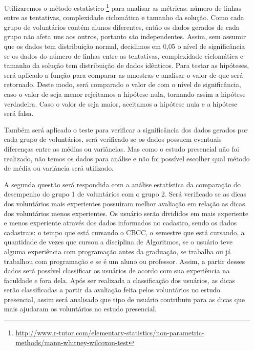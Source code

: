 Utilizaremos o método estatístico \footnote{\url{http://www.r-tutor.com/elementary-statistics/non-parametric-methods/mann-whitney-wilcoxon-test}} para analisar as métricas: número de linhas entre as tentativas, complexidade ciclomática e tamanho da solução. Como cada grupo de voluntários contém alunos diferentes, então os dados gerados de cada grupo não afeta uns aos outros, portanto são independentes. Assim, sem assumir que os dados tem distribuição normal, decidimos em 0,05 o nível de significância se os dados do número de linhas entre as tentativas, complexidade ciclomática e tamanho da solução tem distribuição de dados idênticos. Para testar as hipóteses, será aplicado a função  para comparar as amostras e analisar o valor de  que será retornado. Deste modo, será comparado o valor de  com o nível de significância, caso o valor de  seja menor rejeitamos a hipótese nula, tornando assim a hipótese verdadeira. Caso o valor de  seja maior, aceitamos a hipótese nula e a hipótese será falsa. 

Também será aplicado o teste  \cite{macbeth2011cliff} para verificar a significância dos dados gerados por cada grupo de voluntários, será verificado se os dados possuem eventuais diferenças entre as médias ou variâncias. Mas como o estudo presencial não foi realizado, não temos os dados para análise e não foi possível escolher qual método de média ou variância será utilizado.

A segunda questão será respondida com a análise estatística da comparação do desempenho do grupo 1 de voluntários com o grupo 2. Será verificado se as dicas dos voluntários mais experientes possuíram melhor avaliação em relação as dicas dos voluntários menos experientes. Os usuário serão divididos em mais experiente e menos experiente através dos dados informados no cadastro, sendo os dados cadastrais: o tempo que está cursando o CBCC, o semestre que está cursando, a quantidade de vezes que cursou a disciplina de Algoritmos, se o usuário teve alguma experiência com programação antes da graduação, se trabalha ou já trabalhou com programação e se é um aluno ou professor. Assim, a partir desses dados será possível classificar os usuários de acordo com sua experiência na faculdade e fora dela. Após ser realizada a classificação dos usuários, as dicas serão classificadas a partir da avaliação feita pelos voluntários no estudo presencial, assim será analisado que tipo de usuário contribuiu para as dicas que mais ajudaram os voluntários no estudo presencial.